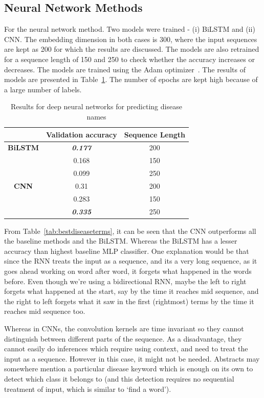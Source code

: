 \subsection{Neural Network Methods}
For the neural network method. Two models were trained - (i) BiLSTM and (ii) CNN. The embedding dimension in both cases is 300, where the input sequences are kept as 200 for which the results are discussed. The models are also retrained for a sequence length of 150 and 250 to check whether the accuracy increases or decreases. The models are trained using the Adam optimizer~\cite{kingma2014adam}. 
The results of models are presented in Table~\ref{tab:DLdiseases}. The number of epochs are kept high because of a large number of labels. 

\begin{table}[!htb]
\centering
\begin{tabular}{|c|c|c|}
\hline
 & Validation accuracy & Sequence Length \\ \hline
\textbf{BiLSTM} & \textit{\textbf{0.177}} & 200 \\ \hline
 & 0.168 & 150 \\ \hline
 & 0.099 & 250 \\ \hline
\textbf{CNN} & 0.31 & 200 \\ \hline
 & 0.283 & 150 \\ \hline
 & \textit{\textbf{0.335}} & 250 \\ \hline
\end{tabular}
\caption{Results for deep neural networks for predicting disease names}
\label{tab:DLdiseases}
\end{table}

From Table~\ref{tab:bestdiseaseterms}, it can be seen that the CNN outperforms all the baseline methods and the BiLSTM. Whereas the BiLSTM has a lesser accuracy than highest baseline MLP classifier. One explanation would be that since the RNN treats the input as a sequence, and its a very long sequence, as it goes ahead working on word after word, it forgets what happened in the words before. Even though we're using a bidirectional RNN, maybe the left to right forgets what happened at the start, say by the time it reaches mid sequence, and the right to left forgets what it saw in the first (rightmost) terms by the time it reaches mid sequence too. 

Whereas in CNNs, the convolution kernels are time invariant so they cannot distinguish between different parts of the sequence. As a disadvantage, they cannot easily do inferences which require using context, and need to treat the input as a sequence. However in this case, it might not be needed. Abstracts may somewhere mention a particular disease keyword  which is enough on its own to detect which class it belongs to (and this detection requires no sequential treatment of input, which is similar to `find a word').

